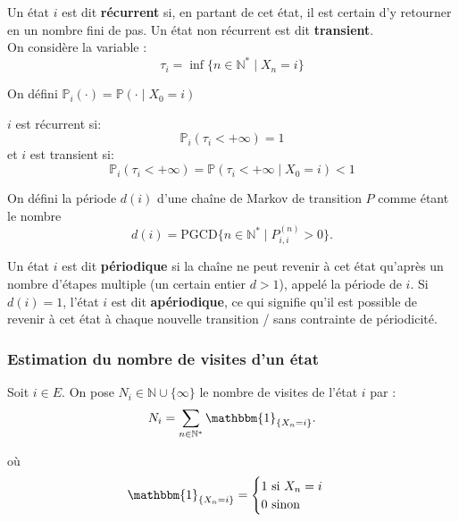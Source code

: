 \documentclass{article}
\begin{document}
\begin{tcolorbox}[colback=white,colframe=blue!80!black,title=État récurrent/transient]
Un état $i$ est dit \textbf{récurrent} si, en partant de cet état, il est certain d'y retourner en un nombre fini de pas. Un état non récurrent est dit \textbf{transient}. \\

On considère la variable :
\[
\tau_i = \inf\{n \in \mathbb{N}^{*} \mid X_n = i\}
\]

On défini $\mathbb{P}_i(\cdot) = \mathbb{P}(\cdot \mid X_0 = i)$

$i$ est récurrent si:
\[
\mathbb{P}_i(\tau_i < +\infty) = 1
\]
et $i$ est transient si:
\[
\mathbb{P}_i(\tau_i < +\infty) = \mathbb{P}(\tau_i < +\infty \mid X_0 = i) < 1
\]
\end{tcolorbox}

\begin{tcolorbox}[colback=white,colframe=blue!80!black,title=État périodique/apériodique]

On défini la période $d(i)$ d'une chaîne de Markov de transition $P$ comme étant le nombre
\[
d(i) = \text{PGCD}\{n \in \mathbb{N}^{*} \mid P_{i,i}^{(n)} > 0\}.
\]

Un état $i$ est dit \textbf{périodique} si la chaîne ne peut revenir à cet état qu'après un nombre d'étapes multiple (un certain entier $d > 1$), appelé la période de $i$.
Si $d(i) = 1$, l'état $i$ est dit \textbf{apériodique}, ce qui signifie qu'il est possible de revenir à cet état à chaque nouvelle transition /  sans contrainte de périodicité.
\end{tcolorbox}


\subsubsection{Estimation du nombre de visites d'un état}

\begin{tcolorbox}[colback=white,colframe=blue!80!black,title=Formule du nombre de visite d'un état]
Soit $i \in E$. On pose $N_i \in \mathbb{N}\cup \{\infty\} $ le nombre de visites de l'état $i$ par :
\[
N_i = \sum_{n \in \mathbb{N}^{*}} \mathbbm{1}_{\{X_n = i\}}.
\]

où
\[
\mathbbm{1}_{\{X_n = i\}} = \begin{cases}
    1 \text{ si } X_n = i\\
    0 \text{ sinon} 
\end{cases}    
\]

\end{tcolorbox}
\end{document}
